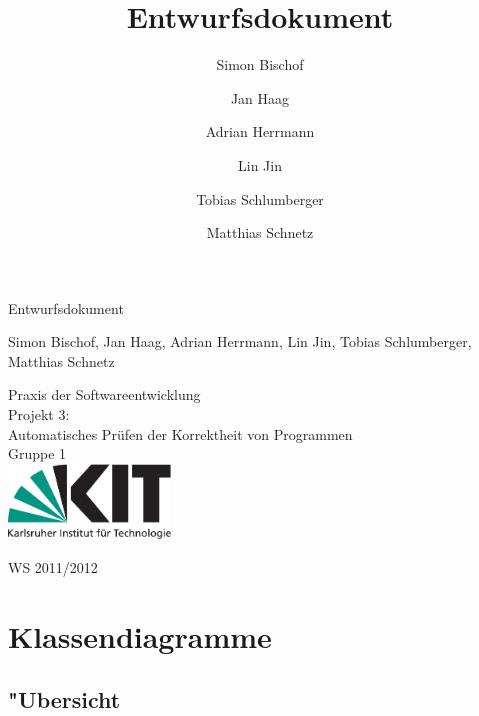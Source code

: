 \documentclass[10pt,a4paper,titlepage]{article}
\title{Entwurfsdokument}
\author{Simon Bischof \and Jan Haag \and Adrian Herrmann \and Lin Jin \and Tobias Schlumberger \and Matthias Schnetz}
\begin{document}
\thispagestyle{empty}
\vspace*{4cm}
\begin{center}
\begin {huge}
Entwurfsdokument\\
\end{huge}
Simon Bischof, Jan Haag, Adrian Herrmann, Lin Jin, Tobias Schlumberger, Matthias Schnetz\\
\vspace{3cm}
\begin{huge}
Praxis der Softwareentwicklung \\
Projekt 3:\\
Automatisches Pr\"{u}fen der Korrektheit von Programmen\\
Gruppe 1\\
\vspace{2cm}
\includegraphics[height=2cm]{images/Logo.pdf}\\[0.5cm]
\end{huge}
\begin{huge}
WS 2011/2012
\end{huge}
\end{center}
\newpage
\tableofcontents
\newpage

\section{Klassendiagramme}

\subsection{"Ubersicht}
\end{document}

